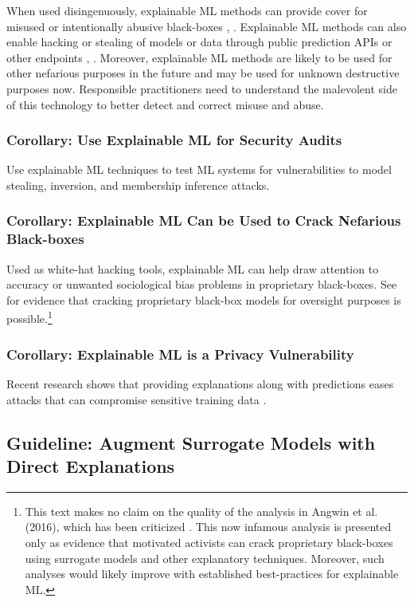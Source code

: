 \documentclass{article}
\begin{document}
When used disingenuously, explainable ML methods can provide cover for misused or intentionally abusive black-boxes \cite{fair_washing}, \cite{please_stop}. Explainable ML methods can also enable hacking or stealing of models or data through public prediction APIs or other endpoints \cite{membership_inference}, \cite{model_stealing}. Moreover, explainable ML methods are likely to be used for other nefarious purposes in the future and may be used for unknown destructive purposes now. Responsible practitioners need to understand the malevolent side of this technology to better detect and correct misuse and abuse. 

\subsubsection{Corollary: Use Explainable ML for Security Audits} Use explainable ML techniques to test ML systems for vulnerabilities to model stealing, inversion, and membership inference attacks. 

\subsubsection{Corollary: Explainable ML Can be Used to Crack Nefarious Black-boxes} Used as white-hat hacking tools, explainable ML can help draw attention to accuracy or unwanted sociological bias problems in proprietary black-boxes. See \citet{angwin16} for evidence that cracking proprietary black-box models for oversight purposes is possible.\footnote{\scriptsize{This text makes no claim on the quality of the analysis in Angwin et al. (2016), which has been criticized \cite{flores2016false}. This now infamous analysis is presented only as evidence that motivated activists can crack proprietary black-boxes using surrogate models and other explanatory techniques. Moreover, such analyses would likely improve with established best-practices for explainable ML.}} 

\subsubsection{Corollary: Explainable ML is a Privacy Vulnerability} Recent research shows that providing explanations along with predictions eases attacks that can compromise sensitive training data \cite{shokri2019privacy}. 

\subsection{Guideline: Augment Surrogate Models with Direct Explanations}
\end{document}
